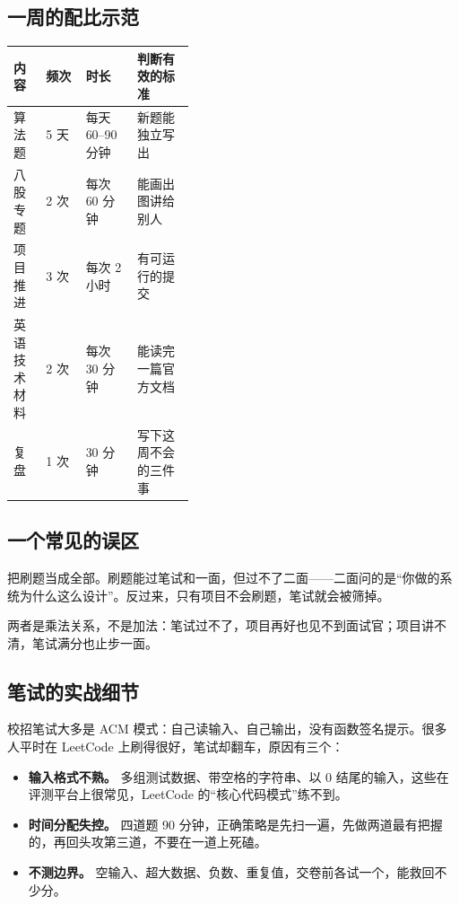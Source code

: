 \documentclass[UTF8,zihao=5,openany]{ctexbook}
\begin{document}
\subsection{一周的配比示范}
\begin{toolbox}
\begin{center}\small
\begin{tabularx}{0.92\linewidth}{p{0.18\linewidth}p{0.22\linewidth}YY}
\toprule
内容 & 频次 & 时长 & 判断有效的标准 \\
\midrule
算法题 & 5 天 & 每天 60--90 分钟 & 新题能独立写出 \\
八股专题 & 2 次 & 每次 60 分钟 & 能画出图讲给别人 \\
项目推进 & 3 次 & 每次 2 小时 & 有可运行的提交 \\
英语技术材料 & 2 次 & 每次 30 分钟 & 能读完一篇官方文档 \\
复盘 & 1 次 & 30 分钟 & 写下这周不会的三件事 \\
\bottomrule
\end{tabularx}
\end{center}
\end{toolbox}

\subsection{一个常见的误区}
把刷题当成全部。刷题能过笔试和一面，但过不了二面——二面问的是“你做的系统为什么这么设计”。反过来，只有项目不会刷题，笔试就会被筛掉。

两者是乘法关系，不是加法：笔试过不了，项目再好也见不到面试官；项目讲不清，笔试满分也止步一面。


\subsection{笔试的实战细节}
校招笔试大多是 ACM 模式：自己读输入、自己输出，没有函数签名提示。很多人平时在 LeetCode 上刷得很好，笔试却翻车，原因有三个：

\begin{itemize}
\item \textbf{输入格式不熟。} 多组测试数据、带空格的字符串、以 0 结尾的输入，这些在评测平台上很常见，LeetCode 的“核心代码模式”练不到。
\item \textbf{时间分配失控。} 四道题 90 分钟，正确策略是先扫一遍，先做两道最有把握的，再回头攻第三道，不要在一道上死磕。
\item \textbf{不测边界。} 空输入、超大数据、负数、重复值，交卷前各试一个，能救回不少分。
\end{itemize}
\end{document}
